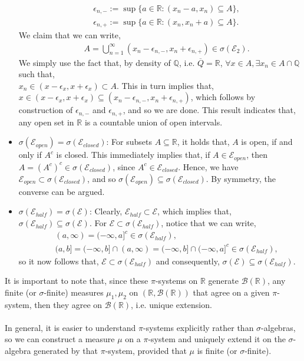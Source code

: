\documentclass{article}
\begin{document}
\begin{itemize}
	\begin{eqnarray}
		\nonumber
		&{}&\epsilon_{n,-} := \sup\{a \in \mathbb{R}: (x_n - a, x_n) \subseteq A\},\\
		\nonumber
		&{}&\epsilon_{n,+} := \sup\{a \in \mathbb{R}: (x_n, x_n + a) \subseteq A\}.
	\end{eqnarray}
	We claim that we can write,
	\begin{eqnarray}
		\nonumber
		&{}&A = \bigcup_{n=1}^{\infty}(x_n - \epsilon_{n,-}, x_n + \epsilon_{n,+}) \in \sigma(\mathcal{E}_2).
	\end{eqnarray}
	We simply use the fact that, by density of $\mathbb{Q}$, i.e. $\overline{Q} = \mathbb{R}$, $\forall x \in A, \exists x_n \in A \cap \mathbb{Q}$ such that,\\ $x_n \in (x - \epsilon_x, x + \epsilon_x) \subset A$. This in turn implies that, $x \in (x - \epsilon_x, x + \epsilon_x) \subseteq (x_n - \epsilon_{n,-}, x_n + \epsilon_{n,+})$, which follows by construction of $\epsilon_{n,-}$ and $\epsilon_{n,+}$, and so we are done. This result indicates that, any open set in $\mathbb{R}$ is a countable union of open intervals.
	\item $\sigma(\mathcal{E}_{open}) = \sigma(\mathcal{E}_{closed})$: For subsets $A \subseteq \mathbb{R}$, it holds that, $A$ is open, if and only if $A^c$ is closed. This immediately implies that, if $A \in \mathcal{E}_{open}$, then $A = (A^c)^c \in \sigma(\mathcal{E}_{closed})$, since $A^c \in \mathcal{E}_{closed}$. Hence, we have $\mathcal{E}_{open} \subset \sigma(\mathcal{E}_{closed})$, and so $\sigma(\mathcal{E}_{open}) \subseteq \sigma(\mathcal{E}_{closed})$. By symmetry, the converse can be argued.
	\item $\sigma(\mathcal{E}_{half}) = \sigma(\mathcal{E})$: Clearly, $\mathcal{E}_{half} \subset \mathcal{E}$, which implies that, $\sigma(\mathcal{E}_{half}) \subseteq \sigma(\mathcal{E})$. For $\mathcal{E} \subset \sigma(\mathcal{E}_{half})$, notice that we can write,
	\begin{eqnarray}
	\nonumber
	&{}&(a, \infty) = (-\infty, a]^c \in \sigma(\mathcal{E}_{half}),\\
	\nonumber
	&{}&(a,b] = (-\infty, b] \cap (a, \infty) = (-\infty, b] \cap (-\infty, a]^c \in \sigma(\mathcal{E}_{half}),
	\end{eqnarray}
	so it now follows that, $\mathcal{E} \subset \sigma(\mathcal{E}_{half})$ and consequently, $\sigma(\mathcal{E}) \subseteq \sigma(\mathcal{E}_{half})$.
\end{itemize}
It is important to note that, since these $\pi$-systems on $\mathbb{R}$ generate $\mathcal{B}(\mathbb{R})$, any finite (or $\sigma$-finite) measures $\mu_1, \mu_2$ on $(\mathbb{R},\mathcal{B}(\mathbb{R}))$ that agree on a given $\pi$-system, then they agree on $\mathcal{B}(\mathbb{R})$, i.e. unique extension. \\\\
In general, it is easier to understand $\pi$-systems explicitly rather than $\sigma$-algebras, so we can construct a measure $\mu$ on a $\pi$-system and uniquely extend it on the $\sigma$-algebra generated by that $\pi$-system, provided that $\mu$ is finite (or $\sigma$-finite).
\end{document}
